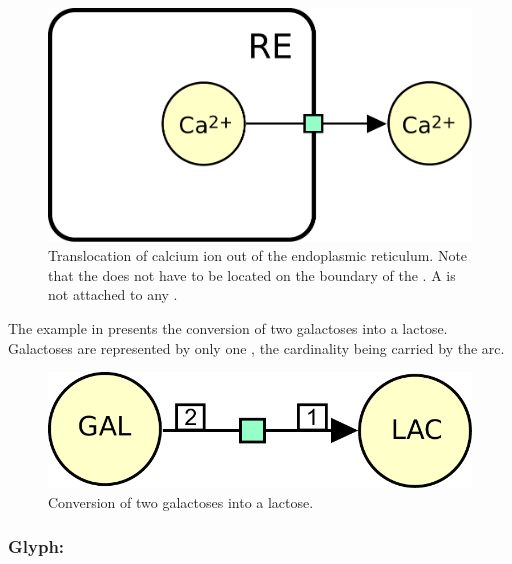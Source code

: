 \begin{figure}[htb]
  \centering
  \includegraphics[scale = 0.5]{le_images/process-translocation}
  \caption{Translocation of calcium ion out of the endoplasmic reticulum. Note that the  does not have to be located on the boundary of the . A  is not attached to any .}
  \label{fig:trans-trans}
\end{figure}

The example in  presents the conversion of two galactoses into a lactose.  Galactoses are represented by only one , the cardinality being carried by the  arc.

\begin{figure}[htb]
  \centering
  \includegraphics[scale = 0.5]{le_images/process-dimerisation}
  \caption{Conversion of two galactoses into a lactose.}
  \label{fig:trans-dim}
\end{figure}

\subsubsection{Glyph: }\label{sec:omitted}

